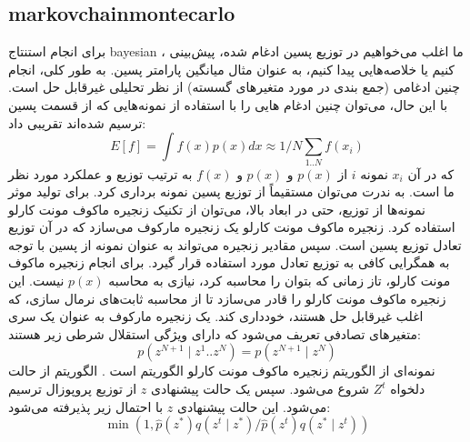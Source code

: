 \subsection{\gls{markovchainmontecarlo}}

برای انجام استنتاج \gls{bayesian} ، ما اغلب می‌خواهیم در توزیع پسین ادغام شده، پیش‌بینی کنیم یا خلاصه‌هایی پیدا کنیم، به عنوان مثال میانگین پارامتر پسین. به طور کلی، انجام چنین ادغامی (جمع بندی در مورد متغیرهای گسسته) از نظر تحلیلی غیرقابل حل است. با این حال، می‌توان چنین ادغام هایی را با استفاده از نمونه‌هایی که از قسمت پسین ترسیم شده‌اند تقریبی داد:
\begin{equation}
	E[f]=\int f(x) p(x) d x \approx 1 / N \sum_{1 . . N} f\left(x_{i}\right)
\end{equation}
که در آن $x_i$  نمونه $i$ از $p(x)$ و $p(x)$  و $f(x)$ به ترتیب توزیع و عملکرد مورد نظر ما است. به ندرت می‌توان مستقیماً از توزیع پسین نمونه برداری کرد. برای تولید موثر نمونه‌ها از توزیع، حتی در ابعاد بالا، می‌توان از تکنیک زنجیره ماکوف مونت کارلو استفاده کرد. زنجیره ماکوف مونت کارلو یک زنجیره مارکوف می‌سازد که در آن توزیع تعادل توزیع پسین است. سپس مقادیر زنجیره می‌تواند به عنوان نمونه از پسین با توجه به همگرایی کافی به توزیع تعادل مورد استفاده قرار گیرد. برای انجام زنجیره ماکوف مونت کارلو، تاز زمانی که بتوان  را محاسبه کرد، نیازی به محاسبه $p(x)$  نیست. این زنجیره ماکوف مونت کارلو را قادر می‌سازد تا از محاسبه ثابت‌های نرمال سازی، که اغلب غیرقابل حل هستند، خودداری کند.
یک زنجیره مارکوف به عنوان یک سری متغیرهای تصادفی تعریف می‌شود که دارای ویژگی استقلال شرطی زیر هستند:
\begin{equation}
	p\left(z^{N+1} \mid z^{1} . . z^{N}\right)=p\left(z^{N+1} \mid z^{N}\right)
\end{equation}
نمونه‌ای از الگوریتم زنجیره ماکوف مونت کارلو الگوریتم  است \cite{hastings1970monte}. الگوریتم   از حالت دلخواه   $Z^t$ شروع می‌شود. سپس یک حالت پیشنهادی $z$  از توزیع پروپوزال  ترسیم می‌شود. این حالت پیشنهادی $z$   با احتمال زیر پذیرفته می‌شود:
\begin{equation}
	\min \left(1, \hat{p}\left(z^{*}\right) q\left(z^{t} \mid z^{*}\right) / \hat{p}\left(z^{t}\right) q\left(z^{*} \mid z^{t}\right)\right)
\end{equation}
